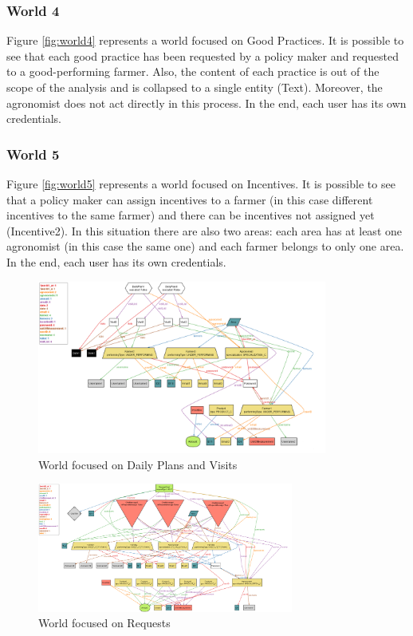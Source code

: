 \subsubsection*{World 4}
Figure \ref{fig:world4} represents a world focused on Good Practices. It is possible to see that each good practice has been requested by a policy maker and requested to a good-performing farmer. Also, the content of each practice is out of the scope of the analysis and is collapsed to a single entity (Text). Moreover, the agronomist does not act directly in this process. In the end, each user has its own credentials.

\subsubsection*{World 5}
Figure \ref{fig:world5} represents a world focused on Incentives. It is possible to see that a policy maker can assign incentives to a farmer (in this case different incentives to the same farmer) and there can be incentives not assigned yet (Incentive2). In this situation there are also two areas: each area has at least one agronomist (in this case the same one) and each farmer belongs to only one area. In the end, each user has its own credentials.

\newpage

\begin{figure}[H]
    \centering
    \includegraphics[angle=90, origin=c, width=0.85\textwidth]{Images/Alloy/world1.png}
    \caption{World focused on Daily Plans and Visits}
    \label{fig:world1}
\end{figure}

\begin{figure}[H]
    \centering
    \includegraphics[angle=90, origin=c, width=0.75\textwidth]{Images/Alloy/world2.png}
    \caption{World focused on Requests}
    \label{fig:world2}
\end{figure}

